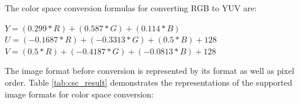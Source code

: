 \documentclass[main\_\_EN.tex]{subfiles}
\begin{document}
The color space conversion formulas for converting RGB to YUV are:
\begin{center}
$Y = (0.299 * R) + (0.587 * G) + (0.114 * B)$ \\
$U = (-0.1687 * R) + (-0.3313 * G) + (0.5 * B) + 128$ \\
$V = (0.5 * R) + (-0.4187 * G) + (-0.0813 * B) + 128$ \\
\end{center}


The image format before conversion is represented by its format as well as pixel order. Table \ref{tab:csc_result} demonstrates the representations of the supported image formats for color space conversion:
\end{document}
